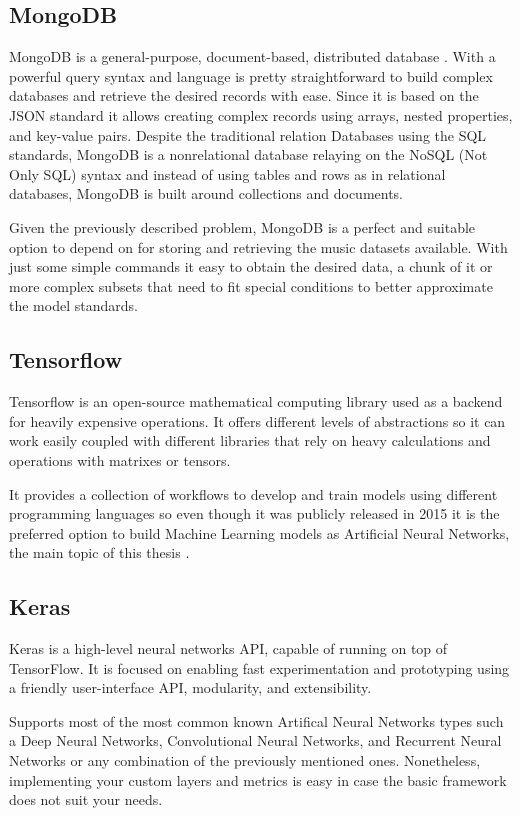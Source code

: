 \subsection{MongoDB}
MongoDB is a general-purpose, document-based, distributed database \cite{mongo}. With a powerful query syntax and language is pretty straightforward to build complex databases and retrieve the desired records with ease.
Since it is based on the JSON\cite{json} standard it allows creating complex records using arrays, nested properties, and key-value pairs.
Despite the traditional relation Databases using the SQL standards, MongoDB is a nonrelational database relaying on the NoSQL (Not Only SQL) syntax and instead of using tables and rows as in relational databases, MongoDB is built around collections and documents.

Given the previously described problem, MongoDB is a perfect and suitable option to depend on for storing and retrieving the music datasets available. With just some simple commands it easy to obtain the desired data, a chunk of it or more complex subsets that need to fit special conditions to better approximate the model standards.

\subsection{Tensorflow}
Tensorflow is an open-source mathematical computing library used as a backend for heavily expensive operations.
It offers different levels of abstractions so it can work easily coupled with different libraries that rely on heavy calculations and operations with matrixes or tensors.

It provides a collection of workflows to develop and train models using different programming languages so even though it was publicly released in 2015 it is the preferred option to build Machine Learning models as Artificial Neural Networks, the main topic of this thesis \cite{tensorflow}.

\subsection{Keras}
Keras is a high-level neural networks API, capable of running on top of TensorFlow. 
It is focused on enabling fast experimentation and prototyping using a friendly user-interface API, modularity, and extensibility. 

Supports most of the most common known Artifical Neural Networks types such a Deep Neural Networks, Convolutional Neural Networks, and Recurrent Neural Networks or any combination of the previously mentioned ones. 
Nonetheless, implementing your custom layers and metrics is easy in case the basic framework does not suit your needs.

